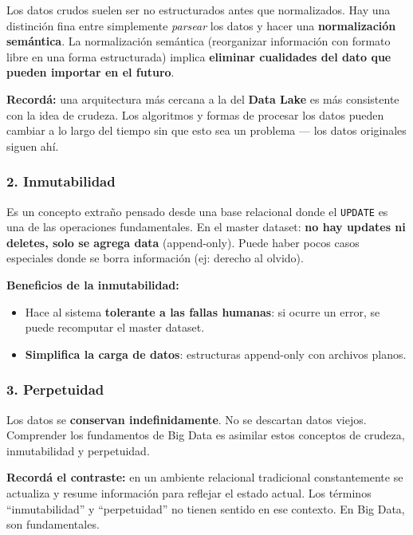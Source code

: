 \documentclass[11pt, a4paper]{article}
\begin{document}
Los datos crudos suelen ser no estructurados antes que normalizados. Hay una distinción fina entre simplemente \textit{parsear} los datos y hacer una \textbf{normalización semántica}. La normalización semántica (reorganizar información con formato libre en una forma estructurada) implica \textbf{eliminar cualidades del dato que pueden importar en el futuro}.

\begin{recallbox}
	\textbf{Recordá:} una arquitectura más cercana a la del \textbf{Data Lake} es más consistente con la idea de crudeza. Los algoritmos y formas de procesar los datos pueden cambiar a lo largo del tiempo sin que esto sea un problema --- los datos originales siguen ahí.
\end{recallbox}

\subsubsection{2. Inmutabilidad}
Es un concepto extraño pensado desde una base relacional donde el \texttt{UPDATE} es una de las operaciones fundamentales. En el master dataset: \textbf{no hay updates ni deletes, solo se agrega data} (append-only). Puede haber pocos casos especiales donde se borra información (ej: derecho al olvido).

\textbf{Beneficios de la inmutabilidad:}
\begin{itemize}
	\item Hace al sistema \textbf{tolerante a las fallas humanas}: si ocurre un error, se puede recomputar el master dataset.
	\item \textbf{Simplifica la carga de datos}: estructuras append-only con archivos planos.
\end{itemize}

\subsubsection{3. Perpetuidad}
Los datos se \textbf{conservan indefinidamente}. No se descartan datos viejos. Comprender los fundamentos de Big Data es asimilar estos conceptos de crudeza, inmutabilidad y perpetuidad.

\begin{recallbox}
	\textbf{Recordá el contraste:} en un ambiente relacional tradicional constantemente se actualiza y resume información para reflejar el estado actual. Los términos ``inmutabilidad'' y ``perpetuidad'' no tienen sentido en ese contexto. En Big Data, son fundamentales.
\end{recallbox}
\end{document}
